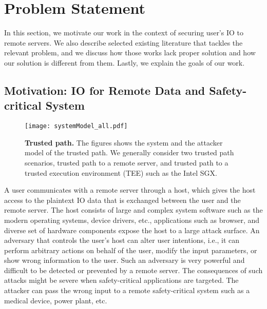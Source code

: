 \section{Problem Statement}
\label{sec:problemStatement}

In this section, we motivate our work in the context of securing user's IO to remote servers. We also describe selected existing literature that tackles the relevant problem, and we discuss how those works lack proper solution and how our solution is different from them. Lastly, we explain the goals of our work.

\subsection{Motivation: IO for Remote Data and Safety-critical System}

\begin{figure}[t]
\centering
\texttt{[image: systemModel\_all.pdf]}
\caption{\textbf{Trusted path.} The figures shows the system and the attacker model of the trusted path. We generally consider two trusted path scenarios, \one trusted path to a remote server, and \two trusted path to a trusted execution environment (TEE) such as the Intel SGX.}
\label{fig:trustedPath}
\centering 
\end{figure}

A user communicates with a remote server through a host, which gives the host access to the plaintext IO data that is exchanged between the user and the remote server. The host consists of large and complex system software such as the modern operating systems, device drivers, etc., applications such as browser, and diverse set of hardware components expose the host to a large attack surface. An adversary that controls the user's host can alter user intentions, i.e., it can perform arbitrary actions on behalf of the user, modify the input parameters, or show wrong information to the user. Such an adversary is very powerful and difficult to be detected or prevented by a remote server. The consequences of such attacks might be severe when safety-critical applications are targeted. The attacker can pass the wrong input to a remote safety-critical system such as a medical device, power plant, etc.

